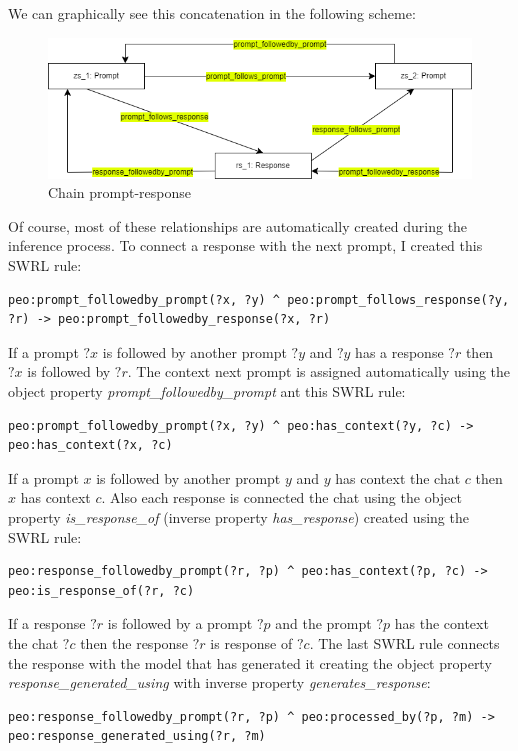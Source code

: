 We can graphically see this concatenation in the following scheme:
\begin{figure}[H]
    \centering
    \includegraphics[width=0.9\linewidth]{Figures/fig_30.png}
    \caption{Chain prompt-response}
    \label{fig:enter-label}
\end{figure}
Of course, most of these relationships are automatically created during the inference process. To connect a response with the next prompt, I created this SWRL rule:
\begin{lstlisting}
peo:prompt_followedby_prompt(?x, ?y) ^ peo:prompt_follows_response(?y, ?r) -> peo:prompt_followedby_response(?x, ?r)
\end{lstlisting}
If a prompt $?x$ is followed by another prompt $?y$ and $?y$ has a response $?r$ then $?x$ is followed by $?r$. The context next prompt is assigned automatically using the object property \textit{prompt\_followedby\_prompt} ant this SWRL rule:
\begin{lstlisting}
peo:prompt_followedby_prompt(?x, ?y) ^ peo:has_context(?y, ?c) -> peo:has_context(?x, ?c)
\end{lstlisting}
If a prompt $x$ is followed by another prompt $y$ and $y$ has context the chat $c$ then $x$ has context $c$. Also each response is connected the chat using the object property \textit{is\_response\_of} (inverse property \textit{has\_response}) created using the SWRL rule:
\begin{lstlisting}
peo:response_followedby_prompt(?r, ?p) ^ peo:has_context(?p, ?c) -> peo:is_response_of(?r, ?c)
\end{lstlisting}
If a response $?r$ is followed by a prompt $?p$ and the prompt $?p$ has the context the chat $?c$ then the response $?r$ is response of $?c$. The last SWRL rule connects the response with the model that has generated it creating the object property \textit{response\_generated\_using} with inverse property \textit{generates\_response}:
\begin{lstlisting}
peo:response_followedby_prompt(?r, ?p) ^ peo:processed_by(?p, ?m) -> peo:response_generated_using(?r, ?m) 
\end{lstlisting}
